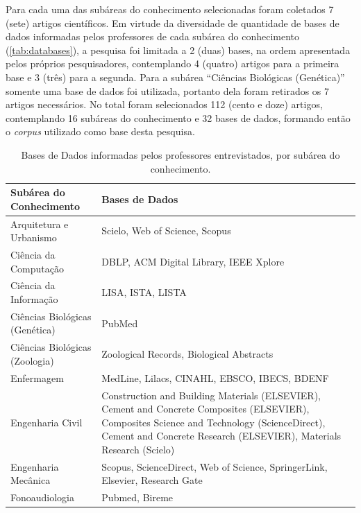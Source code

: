 Para cada uma das subáreas do conhecimento selecionadas foram coletados 7 (sete) artigos científicos. Em virtude da diversidade de quantidade de bases de dados informadas pelos professores de cada subárea do conhecimento (\autoref{tab:databases}), a pesquisa foi limitada a 2 (duas) bases, na ordem apresentada pelos próprios pesquisadores, contemplando 4 (quatro) artigos para a primeira base e 3 (três) para a segunda. Para a subárea ``Ciências Biológicas (Genética)'' somente uma base de dados foi utilizada, portanto dela foram retirados os 7 artigos necessários. No total foram selecionados 112 (cento e doze) artigos, contemplando 16 subáreas do conhecimento e 32 bases de dados, formando então o \emph{corpus} utilizado como base desta pesquisa.

\begin{table}
    \caption{Bases de Dados informadas pelos professores entrevistados, por subárea do conhecimento.}
    \begin{center}
        \begin{tabular}{|p{6cm}|p{8cm}|}
            \hline 
            \textbf{Subárea do Conhecimento} & \textbf{Bases de Dados} \\ 
            \hline 
            Arquitetura e Urbanismo & Scielo, Web of Science, Scopus \\
            \hline
            Ciência da Computação & DBLP, ACM Digital Library, IEEE Xplore \\
            \hline
            Ciência da Informação & LISA, ISTA, LISTA \\
            \hline
            Ciências Biológicas (Genética) & PubMed \\
            \hline
            Ciências Biológicas (Zoologia) & Zoological Records, Biological Abstracts \\
            \hline
            Enfermagem & MedLine, Lilacs, CINAHL, EBSCO, IBECS, BDENF \\
            \hline
            Engenharia Civil & Construction and Building Materials (ELSEVIER), Cement and Concrete Composites (ELSEVIER), Composites Science and Technology (ScienceDirect), Cement and Concrete Research (ELSEVIER), Materials Research (Scielo) \\
            \hline
            Engenharia Mecânica & Scopus, ScienceDirect, Web of Science, SpringerLink, Elsevier, Research Gate \\
            \hline
            Fonoaudiologia & Pubmed, Bireme \\
            \hline

\end{tabular}
\end{center}
\end{table}
